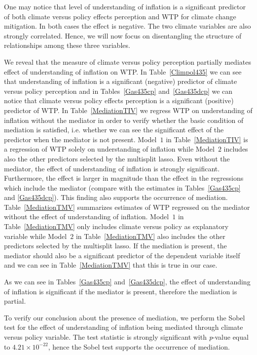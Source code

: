 \documentclass[a4paper,12pt]{article}
\begin{document}
One may notice that level of understanding of inflation is a significant predictor of both climate versus policy effects perception and WTP for climate change mitigation. In both cases the effect is negative. The two climate variables are also strongly correlated. Hence, we will now focus on disentangling the structure of relationships among these three variables.

We reveal that the measure of climate versus policy perception partially mediates effect of understanding of inflation on WTP. In Table~\ref{Climpol435} we can see that understanding of inflation is a significant (negative) predictor of climate versus policy perception and in Tables~\ref{Gas435cp} and~\ref{Gas435dcp} we can notice that climate versus policy effects perception is a significant (positive) predictor of WTP. In Table~\ref{MediationTIV} we regress WTP on understanding of inflation without the mediator in order to verify whether the basic condition of mediation is satisfied, i.e. whether we can see the significant effect of the predictor when the mediator is not present. Model~$1$ in Table~\ref{MediationTIV} is a regression of WTP solely on understanding of inflation while Model~$2$ includes also the other predictors selected by the multisplit lasso. Even without the mediator, the effect of understanding of inflation is strongly significant. Furthermore, the effect is larger in magnitude than the effect in the regressions which include the mediator (compare with the estimates in Tables~\ref{Gas435cp} and \ref{Gas435dcp}). This finding also supports the occurrence of mediation. Table~\ref{MediationTMV} summarizes estimates of WTP regressed on the mediator without the effect of understanding of inflation. Model~$1$ in Table~\ref{MediationTMV} only includes climate versus policy as explanatory variable while Model~$2$ in Table~\ref{MediationTMV} also includes the other predictors selected by the multisplit lasso. If the mediation is present, the mediator should also be a significant predictor of the dependent variable itself and we can see in Table~\ref{MediationTMV} that this is true in our case.


As we can see in Tables~\ref{Gas435cp} and~\ref{Gas435dcp}, the effect of understanding of inflation is significant if the mediator is present, therefore the mediation is partial.


To verify our conclusion about the presence of mediation, we perform the Sobel test for the effect of understanding of inflation being mediated through climate versus policy variable. The test statistic is strongly significant with \textit{p}-value equal to $4.21\times10^{-22}$, hence the Sobel test supports the occurrence of mediation.
\end{document}

